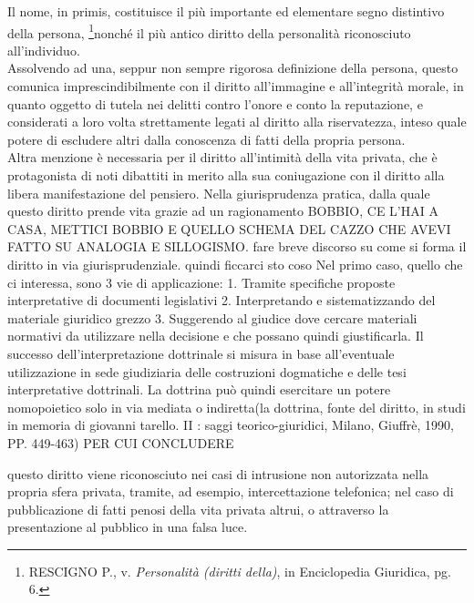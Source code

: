 Il nome, in primis, costituisce il più importante ed elementare segno distintivo della persona, \footnote{RESCIGNO P., v. \textit{Personalità (diritti della)}, in Enciclopedia Giuridica, pg. 6.}nonché il più antico diritto della personalità riconosciuto all'individuo. \\Assolvendo ad una, seppur non sempre rigorosa definizione della persona, questo comunica imprescindibilmente con il diritto all'immagine e all'integrità morale, in quanto oggetto di tutela nei delitti contro l'onore e conto la reputazione, e considerati a loro volta strettamente legati al diritto alla riservatezza, inteso quale potere di escludere altri dalla conoscenza di fatti della propria persona. 
\\Altra menzione è necessaria per il diritto all'intimità della vita privata, che è protagonista di noti dibattiti in merito alla sua coniugazione con il diritto alla libera manifestazione del pensiero. 
Nella giurisprudenza pratica, dalla quale questo diritto prende vita grazie ad un ragionamento BOBBIO, CE L'HAI A CASA, METTICI BOBBIO E QUELLO SCHEMA DEL CAZZO CHE AVEVI FATTO SU ANALOGIA E SILLOGISMO. fare breve discorso su come si forma il diritto in via giurisprudenziale. quindi ficcarci sto coso
Nel primo caso, quello che ci interessa, sono 3 vie di applicazione:
1.	Tramite specifiche proposte interpretative di documenti legislativi
2.	Interpretando e sistematizzando del materiale giuridico grezzo
3.	Suggerendo al giudice dove cercare materiali normativi da utilizzare nella decisione e che possano quindi giustificarla.
Il successo dell’interpretazione dottrinale si misura in base all’eventuale utilizzazione in sede giudiziaria delle costruzioni dogmatiche e delle tesi interpretative dottrinali. La dottrina può quindi esercitare un potere nomopoietico solo in via mediata o indiretta(la dottrina, fonte del diritto, in studi in memoria di giovanni tarello. II : saggi teorico-giuridici, Milano, Giuffrè, 1990, PP. 449-463) PER CUI CONCLUDERE

questo diritto viene riconosciuto nei casi di intrusione non autorizzata nella propria sfera privata, tramite, ad esempio, intercettazione telefonica; nel caso di pubblicazione di fatti penosi della vita privata altrui, o attraverso la presentazione al pubblico in una falsa luce.

